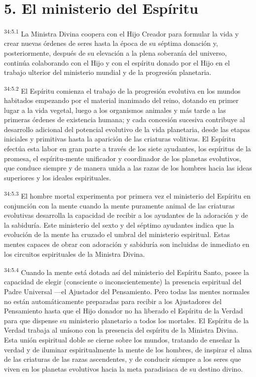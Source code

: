 \section*{5. El ministerio del Espíritu}
\par
\textsuperscript{34:5.1} La Ministra Divina coopera con el Hijo Creador para formular la vida y crear nuevas órdenes de seres hasta la época de su séptima donación y, posteriormente, después de su elevación a la plena soberanía del universo, continúa colaborando con el Hijo y con el espíritu donado por el Hijo en el trabajo ulterior del ministerio mundial y de la progresión planetaria.

\par
\textsuperscript{34:5.2} El Espíritu comienza el trabajo de la progresión evolutiva en los mundos habitados empezando por el material inanimado del reino, dotando en primer lugar a la vida vegetal, luego a los organismos animales y más tarde a las primeras órdenes de existencia humana; y cada concesión sucesiva contribuye al desarrollo adicional del potencial evolutivo de la vida planetaria, desde las etapas iniciales y primitivas hasta la aparición de las criaturas volitivas. El Espíritu efectúa esta labor en gran parte a través de los siete ayudantes, los espíritus de la promesa, el espíritu-mente unificador y coordinador de los planetas evolutivos, que conduce siempre y de manera unida a las razas de los hombres hacia las ideas superiores y los ideales espirituales.

\par
\textsuperscript{34:5.3} El hombre mortal experimenta por primera vez el ministerio del Espíritu en conjunción con la mente cuando la mente puramente animal de las criaturas evolutivas desarrolla la capacidad de recibir a los ayudantes de la adoración y de la sabiduría. Este ministerio del sexto y del séptimo ayudantes indica que la evolución de la mente ha cruzado el umbral del ministerio espiritual. Estas mentes capaces de obrar con adoración y sabiduría son incluidas de inmediato en los circuitos espirituales de la Ministra Divina.

\par
\textsuperscript{34:5.4} Cuando la mente está dotada así del ministerio del Espíritu Santo, posee la capacidad de elegir (consciente o inconscientemente) la presencia espiritual del Padre Universal ---el Ajustador del Pensamiento. Pero todas las mentes normales no están automáticamente preparadas para recibir a los Ajustadores del Pensamiento hasta que el Hijo donador no ha liberado el Espíritu de la Verdad para que dispense su ministerio planetario a todos los mortales. El Espíritu de la Verdad trabaja al unísono con la presencia del espíritu de la Ministra Divina. Esta unión espiritual doble se cierne sobre los mundos, tratando de enseñar la verdad y de iluminar espiritualmente la mente de los hombres, de inspirar el alma de las criaturas de las razas ascendentes, y de conducir siempre a los seres que viven en los planetas evolutivos hacia la meta paradisiaca de su destino divino.

